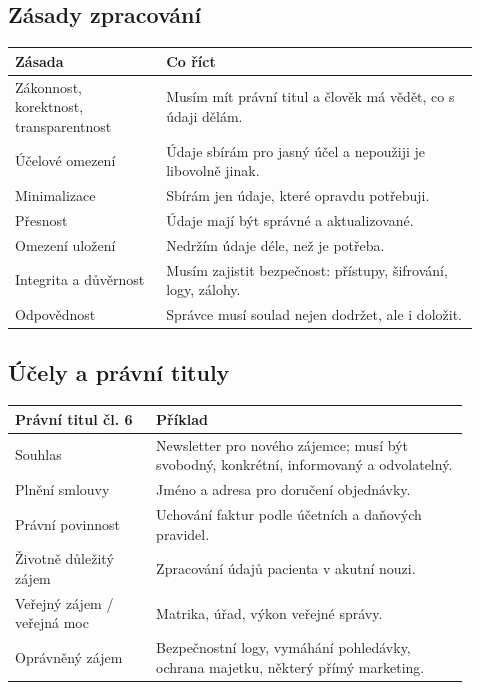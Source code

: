 \subsection*{Zásady zpracování}
\begin{longtable}{p{0.30\linewidth}p{0.62\linewidth}}
\toprule
\textbf{Zásada} & \textbf{Co říct}\\
\midrule
Zákonnost, korektnost, transparentnost & Musím mít právní titul a člověk má vědět, co s údaji dělám.\\
Účelové omezení & Údaje sbírám pro jasný účel a nepoužiji je libovolně jinak.\\
Minimalizace & Sbírám jen údaje, které opravdu potřebuji.\\
Přesnost & Údaje mají být správné a aktualizované.\\
Omezení uložení & Nedržím údaje déle, než je potřeba.\\
Integrita a důvěrnost & Musím zajistit bezpečnost: přístupy, šifrování, logy, zálohy.\\
Odpovědnost & Správce musí soulad nejen dodržet, ale i doložit.\\
\bottomrule
\end{longtable}

\subsection*{Účely a právní tituly}

\begin{longtable}{p{0.28\linewidth}p{0.62\linewidth}}
\toprule
\textbf{Právní titul čl. 6} & \textbf{Příklad}\\
\midrule
Souhlas & Newsletter pro nového zájemce; musí být svobodný, konkrétní, informovaný a odvolatelný.\\
Plnění smlouvy & Jméno a adresa pro doručení objednávky.\\
Právní povinnost & Uchování faktur podle účetních a daňových pravidel.\\
Životně důležitý zájem & Zpracování údajů pacienta v akutní nouzi.\\
Veřejný zájem / veřejná moc & Matrika, úřad, výkon veřejné správy.\\
Oprávněný zájem & Bezpečnostní logy, vymáhání pohledávky, ochrana majetku, některý přímý marketing.\\
\bottomrule
\end{longtable}

